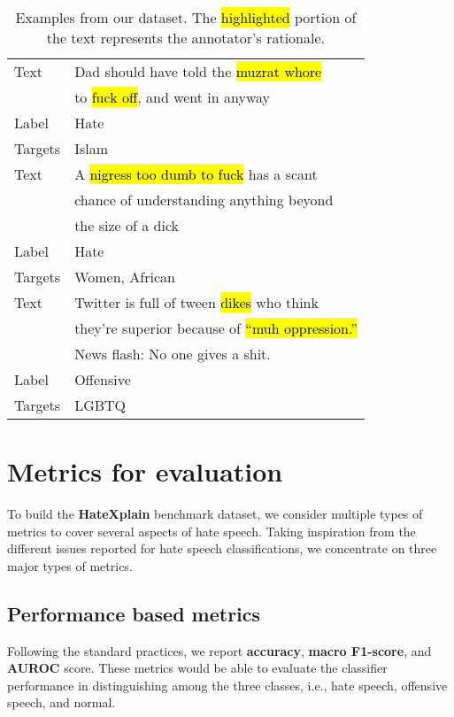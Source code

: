 \documentclass[letterpaper]{article} \usepackage{aaai21}  \usepackage{times}  \usepackage{helvet} \usepackage{courier}  \usepackage[hyphens]{url}  \usepackage{graphicx} \urlstyle{rm} \def\UrlFont{\rm}  \usepackage{natbib}  \usepackage{caption}
\begin{document}
\begin{table}[t]
\centering
\scriptsize
\begin{tabular}{ll}
\toprule
Text & Dad should have told the \hl{muzrat whore} \\
&to \hl{fuck off}, and went in anyway\\
Label & Hate \\
Targets & Islam \\ 
\midrule
Text & A \hl{nigress too dumb to fuck} has a scant \\
&chance of understanding anything beyond\\
&the size of a dick \\
Label & Hate \\
Targets & Women, African \\ 
\midrule
Text & Twitter is full of tween \hl{dikes} who think \\
&they're superior because of \hl{``muh oppression.''} \\
&News flash: No one gives a shit. \\
Label & Offensive \\
Targets & LGBTQ \\ 

\bottomrule
\end{tabular}
\caption{Examples from our dataset. The \hl{highlighted} portion of the text represents the annotator's rationale.}

\label{tab:dataset_example}
\end{table}




 
\section{Metrics for evaluation}
To build the {\bf{HateXplain}} benchmark dataset, we consider multiple types of metrics to cover several aspects of hate speech. Taking inspiration from the different issues reported for hate speech classifications, we concentrate on three major types of metrics.

\subsection{Performance based metrics}
Following the standard practices, we report \textbf{accuracy}, \textbf{macro F1-score}, and \textbf{AUROC} score. These metrics would be able to evaluate the classifier performance in distinguishing among the three classes, i.e., hate speech, offensive speech, and normal.
\end{document}
